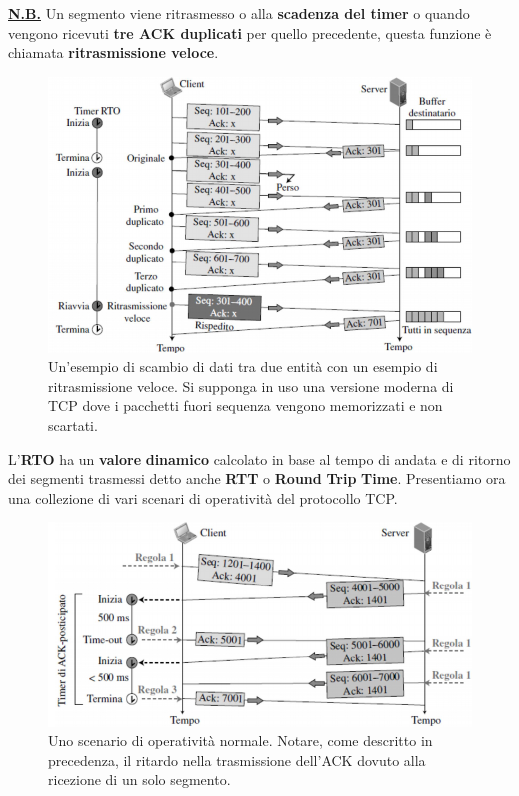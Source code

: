 \documentclass[11pt,a4paper]{article}
\theoremstyle{definition}
\begin{document}
\newpage
\textbf{\underline{N.B.}} Un segmento viene ritrasmesso o alla \textbf{scadenza del timer} o quando vengono ricevuti \textbf{tre ACK duplicati} per quello precedente, questa funzione è chiamata \textbf{ritrasmissione veloce}.
\begin{figure}[!h]
	\includegraphics[scale=0.4]{Immagini/Fast_retrsm.png}
	\centering
	\caption{Un'esempio di scambio di dati tra due entità con un esempio di ritrasmissione veloce. Si supponga in uso una versione moderna di TCP dove i pacchetti fuori sequenza vengono memorizzati e non scartati.}
\end{figure}\newline
L'\textbf{RTO} ha un \textbf{valore} \textbf{dinamico} calcolato in base al tempo di andata e di ritorno dei segmenti trasmessi detto anche \textbf{RTT} o \textbf{Round} \textbf{Trip} \textbf{Time}.\newline\newline
Presentiamo ora una collezione di vari scenari di operatività del protocollo TCP.
\begin{figure}[!h]
	\includegraphics[scale=0.35]{Immagini/Norm_op.png}
	\centering
	\caption{Uno scenario di operatività normale. Notare, come descritto in precedenza, il ritardo nella trasmissione dell'ACK dovuto alla ricezione di un solo segmento.}
\end{figure}
\end{document}
